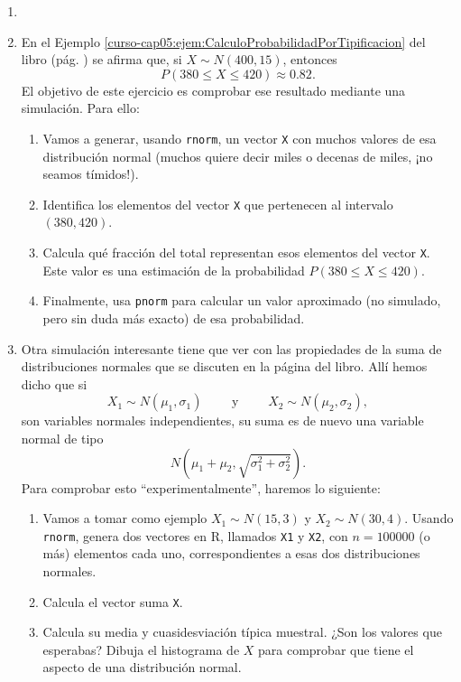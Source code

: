 \documentclass[10pt,a4paper]{article}\usepackage[]{graphicx}\usepackage[]{color}
\begin{document}
\begin{ejercicio}
\label{tut05:ejercicio24}
\begin{enumerate}
  \item[]
  \item En el Ejemplo \ref{curso-cap05:ejem:CalculoProbabilidadPorTipificacion} del libro (pág. \pageref{curso-cap05:ejem:CalculoProbabilidadPorTipificacion}) se afirma que, si $X\sim N(400, 15)$, entonces
      \[P(380\leq X\leq 420)\approx 0.82.\]
      El objetivo de este ejercicio es comprobar ese resultado mediante una simulación. Para ello:
      \begin{enumerate}
        \item Vamos a generar, usando {\tt rnorm}, un vector {\tt X} con muchos  valores de esa distribución normal (muchos quiere decir miles o decenas de miles, ¡no seamos tímidos!).
        \item Identifica los elementos del vector {\tt X} que pertenecen al intervalo $(380, 420)$.
        \item Calcula qué fracción del total representan esos elementos del vector {\tt X}. Este valor es una estimación de la probabilidad $P(380\leq X\leq 420)$.
        \item Finalmente, usa {\tt pnorm} para calcular un valor aproximado (no simulado, pero sin duda más exacto) de esa probabilidad.
      \end{enumerate}

  \item Otra simulación interesante tiene que ver con las propiedades de la suma de distribuciones normales que se discuten en la página \pageref{curso-cap05:subsubsec:SumaVariablesAleatoriasNormales} del libro. Allí hemos dicho que si
       \[X_1\sim N(\mu_1,\sigma_1)\qquad \mbox{ y }\qquad X_2\sim N(\mu_2,\sigma_2),\]
       son variables normales independientes, su suma {\sf es de nuevo una variable normal} de tipo
        \[N\left(\mu_1+\mu_2,\sqrt{\sigma_1^2+\sigma_2^2}\right).\]
        Para comprobar esto ``experimentalmente'', haremos lo siguiente:
        \begin{enumerate}
          \item Vamos a tomar como ejemplo $X_1\sim N(15, 3)$ y $X_2\sim N(30, 4)$. Usando {\tt rnorm}, genera dos vectores en R, llamados {\tt X1} y {\tt X2}, con $n=100000$ (o más) elementos cada uno, correspondientes a esas dos distribuciones normales.
          \item Calcula el vector suma {\tt X}.
          \item Calcula su media y cuasidesviación típica muestral. ¿Son los valores que esperabas? Dibuja el histograma de $X$ para comprobar que tiene el aspecto de una distribución normal.


\end{enumerate}
\end{enumerate}
\end{ejercicio}
\end{document}
